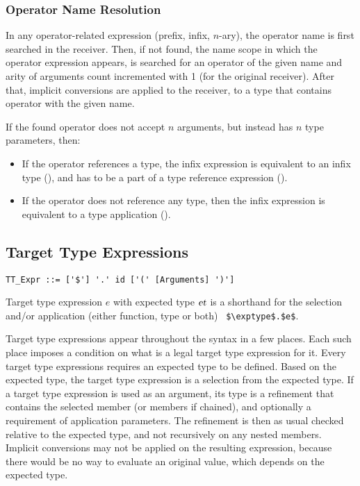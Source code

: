 \subsubsection{Operator Name Resolution}

In any operator-related expression (prefix, infix, $n$-ary), the operator name is first searched in the receiver. Then, if not found, the name scope in which the operator expression appears, is searched for an operator of the given name and arity of arguments count incremented with 1 (for the original receiver). After that, implicit conversions are applied to the receiver, to a type that contains operator with the given name. 

If the found operator does not accept $n$ arguments, but instead has $n$ type parameters, then:
\begin{itemize} 
  \item If the operator references a type, the infix expression is equivalent to an infix type (), and has to be a part of a type reference expression (). 
  \item If the operator does not reference any type, then the infix expression is equivalent to a type application (). 
\end{itemize}





\subsection{Target Type Expressions}
\label{sec:target-type-expressions}

\syntax\begin{lstlisting}[mathescape=false]
TT_Expr ::= ['$'] '.' id ['(' [Arguments] ')']
\end{lstlisting}

Target type expression $e$ with expected type $\mbox{\sl et}$ is a shorthand for the selection and/or application (either function, type or both) ~\lstinline!$\exptype$.$e$!. 

Target type expressions appear throughout the syntax in a few places. Each such place imposes a condition on what is a legal target type expression for it. Every target type expressions requires an expected type to be defined. Based on the expected type, the target type expression is a selection from the expected type. If a target type expression is used as an argument, its type is a refinement that contains the selected member (or members if chained), and optionally a requirement of application parameters. The refinement is then as usual checked relative to the expected type, and not recursively on any nested members. Implicit conversions may not be applied on the resulting expression, because there would be no way to evaluate an original value, which depends on the expected type. 

